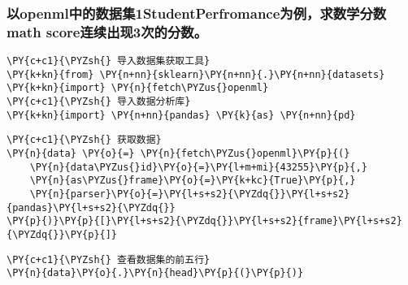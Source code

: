     \hypertarget{ux4ee5openmlux4e2dux7684ux6570ux636eux96c61studentperfromanceux4e3aux4f8bux6c42ux6570ux5b66ux5206ux6570math-scoreux8fdeux7eedux51faux73b03ux6b21ux7684ux5206ux6570}{%
\subsubsection{以openml中的数据集1StudentPerfromance为例，求数学分数math
score连续出现3次的分数。}\label{ux4ee5openmlux4e2dux7684ux6570ux636eux96c61studentperfromanceux4e3aux4f8bux6c42ux6570ux5b66ux5206ux6570math-scoreux8fdeux7eedux51faux73b03ux6b21ux7684ux5206ux6570}}

    \begin{tcolorbox}[breakable, size=fbox, boxrule=1pt, pad at break*=1mm,colback=cellbackground, colframe=cellborder]
\begin{Verbatim}[commandchars=\\\{\}]
\PY{c+c1}{\PYZsh{} 导入数据集获取工具}
\PY{k+kn}{from} \PY{n+nn}{sklearn}\PY{n+nn}{.}\PY{n+nn}{datasets} \PY{k+kn}{import} \PY{n}{fetch\PYZus{}openml}
\PY{c+c1}{\PYZsh{} 导入数据分析库}
\PY{k+kn}{import} \PY{n+nn}{pandas} \PY{k}{as} \PY{n+nn}{pd}
\end{Verbatim}
\end{tcolorbox}

    \begin{tcolorbox}[breakable, size=fbox, boxrule=1pt, pad at break*=1mm,colback=cellbackground, colframe=cellborder]
\begin{Verbatim}[commandchars=\\\{\}]
\PY{c+c1}{\PYZsh{} 获取数据}
\PY{n}{data} \PY{o}{=} \PY{n}{fetch\PYZus{}openml}\PY{p}{(}
    \PY{n}{data\PYZus{}id}\PY{o}{=}\PY{l+m+mi}{43255}\PY{p}{,}
    \PY{n}{as\PYZus{}frame}\PY{o}{=}\PY{k+kc}{True}\PY{p}{,}
    \PY{n}{parser}\PY{o}{=}\PY{l+s+s2}{\PYZdq{}}\PY{l+s+s2}{pandas}\PY{l+s+s2}{\PYZdq{}}
\PY{p}{)}\PY{p}{[}\PY{l+s+s2}{\PYZdq{}}\PY{l+s+s2}{frame}\PY{l+s+s2}{\PYZdq{}}\PY{p}{]}
\end{Verbatim}
\end{tcolorbox}

    \begin{tcolorbox}[breakable, size=fbox, boxrule=1pt, pad at break*=1mm,colback=cellbackground, colframe=cellborder]
\begin{Verbatim}[commandchars=\\\{\}]
\PY{c+c1}{\PYZsh{} 查看数据集的前五行}
\PY{n}{data}\PY{o}{.}\PY{n}{head}\PY{p}{(}\PY{p}{)}
\end{Verbatim}
\end{tcolorbox}

